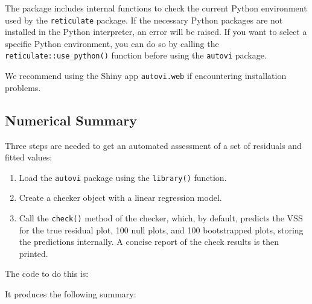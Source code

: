 \documentclass[
doublespace,
  times]{anzsauth}
\newenvironment{Shaded}{\begin{snugshade}}{\end{snugshade}}
\newcommand{\AttributeTok}[1]{\textcolor[rgb]{0.40,0.45,0.13}{#1}}
\newcommand{\FunctionTok}[1]{\textcolor[rgb]{0.28,0.35,0.67}{#1}}
\newcommand{\NormalTok}[1]{\textcolor[rgb]{0.00,0.23,0.31}{#1}}
\newcommand{\OtherTok}[1]{\textcolor[rgb]{0.00,0.23,0.31}{#1}}
\newcommand{\SpecialCharTok}[1]{\textcolor[rgb]{0.37,0.37,0.37}{#1}}
\providecommand{\tightlist}{%
  \setlength{\itemsep}{0pt}\setlength{\parskip}{0pt}}\usepackage{longtable,booktabs,array}
\begin{document}
The package includes internal functions to check the current Python
environment used by the \texttt{reticulate} package. If the necessary
Python packages are not installed in the Python interpreter, an error
will be raised. If you want to select a specific Python environment, you
can do so by calling the \texttt{reticulate::use\_python()} function
before using the \texttt{autovi} package.

We recommend using the Shiny app \texttt{autovi.web} if encountering
installation problems.

\subsection{Numerical Summary}\label{sec-autovi-usage}

Three steps are needed to get an automated assessment of a set of
residuals and fitted values:

\begin{enumerate}
\def\labelenumi{\arabic{enumi}.}
\tightlist
\item
  Load the \texttt{autovi} package using the \texttt{library()}
  function.
\item
  Create a checker object with a linear regression model.
\item
  Call the \texttt{check()} method of the checker, which, by default,
  predicts the VSS for the true residual plot, 100 null plots, and 100
  bootstrapped plots, storing the predictions internally. A concise
  report of the check results is then printed.
\end{enumerate}

The code to do this is:

\begin{Shaded}
\end{Shaded}

It produces the following summary:

\begin{verbatim}
\end{verbatim}
\end{document}
